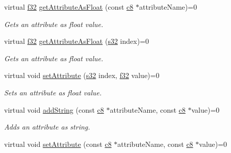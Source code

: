 \begin{DoxyCompactItemize}
virtual \hyperlink{namespaceirr_a0277be98d67dc26ff93b1a6a1d086b07}{f32} \hyperlink{classirr_1_1io_1_1IAttributes_a9bfcf5b9dae3fa18796c74888bef977f}{get\+Attribute\+As\+Float} (const \hyperlink{namespaceirr_a9395eaea339bcb546b319e9c96bf7410}{c8} $\ast$attribute\+Name)=0
\begin{DoxyCompactList}\small\item\em Gets an attribute as float value. \end{DoxyCompactList}\item 
virtual \hyperlink{namespaceirr_a0277be98d67dc26ff93b1a6a1d086b07}{f32} \hyperlink{classirr_1_1io_1_1IAttributes_a9ef1a4d52b39daa2f0645df4eb8f40a9}{get\+Attribute\+As\+Float} (\hyperlink{namespaceirr_ac66849b7a6ed16e30ebede579f9b47c6}{s32} index)=0
\begin{DoxyCompactList}\small\item\em Gets an attribute as float value. \end{DoxyCompactList}\item 
\mbox{\label{classirr_1_1io_1_1IAttributes_a7346bf5c9c2e42c05d5827872e77c51b}} 
virtual void \hyperlink{classirr_1_1io_1_1IAttributes_a7346bf5c9c2e42c05d5827872e77c51b}{set\+Attribute} (\hyperlink{namespaceirr_ac66849b7a6ed16e30ebede579f9b47c6}{s32} index, \hyperlink{namespaceirr_a0277be98d67dc26ff93b1a6a1d086b07}{f32} value)=0
\begin{DoxyCompactList}\small\item\em Sets an attribute as float value. \end{DoxyCompactList}\item 
\mbox{\label{classirr_1_1io_1_1IAttributes_a051f092d809f9d40215a1480d9d69afc}} 
virtual void \hyperlink{classirr_1_1io_1_1IAttributes_a051f092d809f9d40215a1480d9d69afc}{add\+String} (const \hyperlink{namespaceirr_a9395eaea339bcb546b319e9c96bf7410}{c8} $\ast$attribute\+Name, const \hyperlink{namespaceirr_a9395eaea339bcb546b319e9c96bf7410}{c8} $\ast$value)=0
\begin{DoxyCompactList}\small\item\em Adds an attribute as string. \end{DoxyCompactList}\item 
virtual void \hyperlink{classirr_1_1io_1_1IAttributes_a9ff2fbcb3861c59159661aaebc84cb27}{set\+Attribute} (const \hyperlink{namespaceirr_a9395eaea339bcb546b319e9c96bf7410}{c8} $\ast$attribute\+Name, const \hyperlink{namespaceirr_a9395eaea339bcb546b319e9c96bf7410}{c8} $\ast$value)=0

\end{DoxyCompactItemize}
